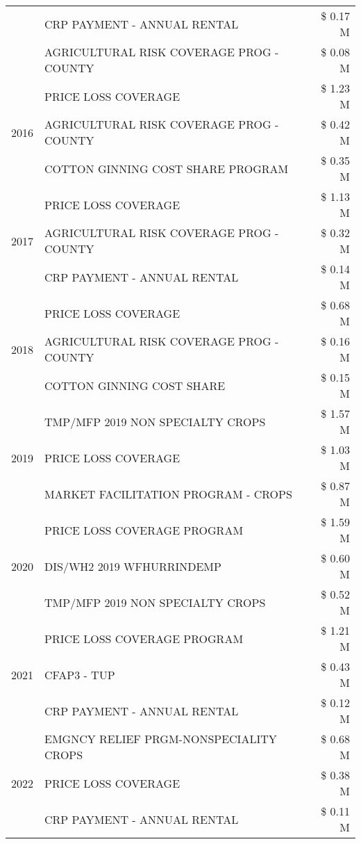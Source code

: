 \begin{tabular}{llr}
 & CRP PAYMENT - ANNUAL RENTAL & \$ 0.17 M \\
 & AGRICULTURAL RISK COVERAGE PROG - COUNTY & \$ 0.08 M \\
\cline{1-3}
\multirow[t]{3}{*}{2016} & PRICE LOSS COVERAGE & \$ 1.23 M \\
 & AGRICULTURAL RISK COVERAGE PROG - COUNTY & \$ 0.42 M \\
 & COTTON GINNING COST SHARE PROGRAM & \$ 0.35 M \\
\cline{1-3}
\multirow[t]{3}{*}{2017} & PRICE LOSS COVERAGE & \$ 1.13 M \\
 & AGRICULTURAL RISK COVERAGE PROG - COUNTY & \$ 0.32 M \\
 & CRP PAYMENT - ANNUAL RENTAL & \$ 0.14 M \\
\cline{1-3}
\multirow[t]{3}{*}{2018} & PRICE LOSS COVERAGE & \$ 0.68 M \\
 & AGRICULTURAL RISK COVERAGE PROG - COUNTY & \$ 0.16 M \\
 & COTTON GINNING COST SHARE & \$ 0.15 M \\
\cline{1-3}
\multirow[t]{3}{*}{2019} & TMP/MFP 2019 NON SPECIALTY CROPS & \$ 1.57 M \\
 & PRICE LOSS COVERAGE & \$ 1.03 M \\
 & MARKET FACILITATION PROGRAM - CROPS & \$ 0.87 M \\
\cline{1-3}
\multirow[t]{3}{*}{2020} & PRICE LOSS COVERAGE PROGRAM & \$ 1.59 M \\
 & DIS/WH2 2019 WFHURRINDEMP & \$ 0.60 M \\
 & TMP/MFP 2019 NON SPECIALTY CROPS & \$ 0.52 M \\
\cline{1-3}
\multirow[t]{3}{*}{2021} & PRICE LOSS COVERAGE PROGRAM & \$ 1.21 M \\
 & CFAP3 - TUP & \$ 0.43 M \\
 & CRP PAYMENT - ANNUAL RENTAL & \$ 0.12 M \\
\cline{1-3}
\multirow[t]{3}{*}{2022} & EMGNCY RELIEF PRGM-NONSPECIALITY CROPS & \$ 0.68 M \\
 & PRICE LOSS COVERAGE & \$ 0.38 M \\
 & CRP PAYMENT - ANNUAL RENTAL & \$ 0.11 M \\
\cline{1-3}
\bottomrule
\end{tabular}
